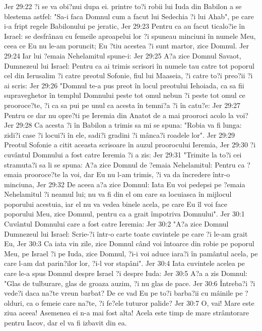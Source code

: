 Jer 29:22  ?i se va obi?nui dupa ei. printre to?i robii lui Iuda din Babilon a se blestema astfel: "Sa-i faca Domnul cum a facut lui Sedechia ?i lui Ahab", pe care i-a fript regele Babilonului pe jeratic,
Jer 29:23  Pentru ca au facut ticalo?ie în Israel: se desfrânau cu femeile aproapelui lor ?i spuneau minciuni în numele Meu, ceea ce Eu nu le-am poruncit; Eu ?tiu acestea ?i sunt martor, zice Domnul.
Jer 29:24  Iar lui ?emaia Nehelamitul spune-i:
Jer 29:25  A?a zice Domnul Savaot, Dumnezeul lui Israel: Pentru ca ai trimis scrisori în numele tau catre tot poporul cel din Ierusalim ?i catre preotul Sofonie, fiul lui Maaseia, ?i catre to?i preo?ii ?i ai scris:
Jer 29:26  "Domnul te-a pus preot în locul preotului Iehoiada, ca sa fii supraveghetor în templul Domnului peste tot omul nebun ?i peste tot omul ce prooroce?te, ?i ca sa pui pe unul ca acesta în temni?a ?i în catu?e:
Jer 29:27  Pentru ce dar nu opre?ti pe Ieremia din Anatot de a mai prooroci acolo la voi?
Jer 29:28  Ca acesta ?i în Babilon a trimis sa mi se spuna: "Robia va fi lunga: zidi?i case ?i locui?i în ele, sadi?i gradini ?i mânca?i roadele lor".
Jer 29:29  Preotul Sofonie a citit aceasta scrisoare în auzul proorocului Ieremia,
Jer 29:30  ?i cuvântul Domnului a fost catre Ieremia ?i a zis:
Jer 29:31  "Trimite la to?i cei stramuta?i sa li se spuna: A?a zice Domnul de ?emaia Nehelamitul: Pentru ca ?emaia prooroce?te la voi, dar Eu nu l-am trimis, ?i va da încredere într-o minciuna,
Jer 29:32  De aceea a?a zice Domnul: Iata Eu voi pedepsi pe ?emaia Nehelamitul ?i neamul lui; nu va fi din el om care sa locuiasca în mijlocul poporului acestuia, iar el nu va vedea binele acela, pe care Eu îl voi face poporului Meu, zice Domnul, pentru ca a grait împotriva Domnului".
Jer 30:1  Cuvântul Domnului care a fost catre Ieremia:
Jer 30:2  "A?a zice Domnul Dumnezeul lui Israel: Scrie-?i într-o carte toate cuvintele pe care ?i le-am grait Eu,
Jer 30:3  Ca iata vin zile, zice Domnul când voi întoarce din robie pe poporul Meu, pe Israel ?i pe Iuda, zice Domnul, ?i-i voi aduce iara?i în pamântul acela, pe care l-am dat parin?ilor lor, ?i-l vor stapâni".
Jer 30:4  Iata cuvintele acelea pe care le-a spus Domnul despre Israel ?i despre Iuda:
Jer 30:5  A?a a zis Domnul: "Glas de tulburare, glas de groaza auzim, ?i nu glas de pace.
Jer 30:6  Întreba?i ?i vede?i daca na?te vreun barbat? De ce vad Eu pe to?i barba?ii cu mâinile pe ?olduri, ca o femeie care na?te, ?i fe?ele tuturor palide?
Jer 30:7  O, vai! Mare este ziua aceea! Asemenea ei n-a mai fost alta! Acela este timp de mare strâmtorare pentru Iacov, dar el va fi izbavit din ea.
